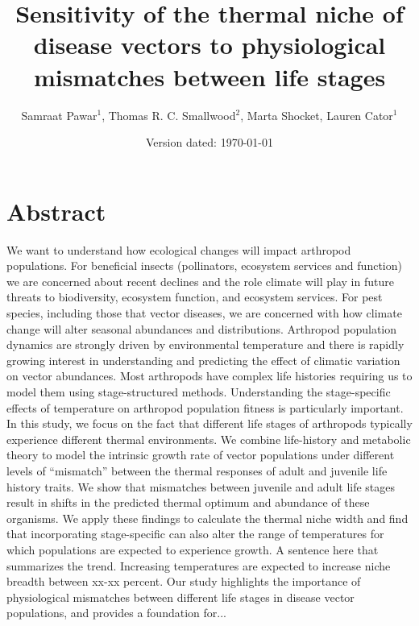 

\title{Sensitivity of the thermal niche of disease vectors to physiological mismatches between life stages}

\author{Samraat Pawar$^1$, Thomas R. C. Smallwood$^2$, Marta Shocket, Lauren Cator$^1$}


\date{Version dated: \today}




\maketitle


\section*{Abstract}

We want to understand how ecological changes will impact arthropod populations. For beneficial insects (pollinators, ecosystem services and function) we are concerned about recent declines and the role climate will play in future threats to biodiversity, ecosystem function, and ecosystem services. For pest species, including those that vector diseases, we are concerned with how climate change will alter seasonal abundances and distributions.  Arthropod population dynamics are strongly driven by environmental temperature and there is rapidly growing interest in understanding and predicting the effect of climatic variation on vector abundances. Most arthropods have complex life histories requiring us to model them using stage-structured methods.  Understanding the stage-specific effects of temperature on arthropod population fitness is particularly important.  In this study, we focus on the fact that different life stages of arthropods typically experience different thermal environments. We combine life-history and metabolic theory to model the intrinsic growth rate of vector populations under different levels of ``mismatch'' between the thermal responses of adult and juvenile life history traits. We show that mismatches between juvenile and adult life stages result in shifts in the predicted thermal optimum and abundance of these organisms. We apply these findings to calculate the thermal niche width and find that incorporating stage-specific can also alter the range of temperatures for which populations are expected to experience growth. A sentence here that summarizes the trend. Increasing temperatures are expected to increase niche breadth between xx-xx percent. Our study highlights the importance of physiological mismatches between different life stages in disease vector populations, and provides a foundation for...

